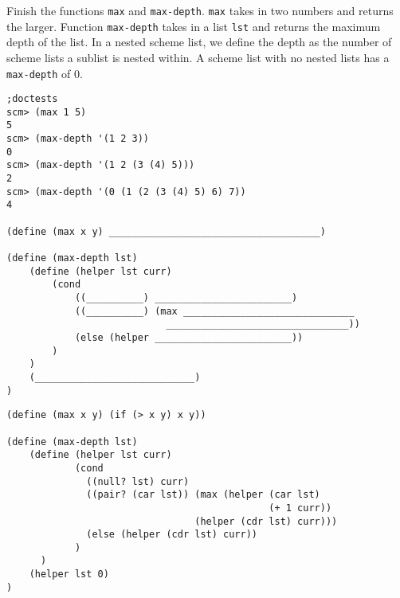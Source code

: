 \begin{blocksection}
\question Finish the functions \lstinline{max} and \lstinline{max-depth}. \lstinline{max} takes in two numbers and returns the larger. Function \lstinline{max-depth} takes in a list \lstinline{lst} and returns the maximum depth of the list. In a nested scheme list, we define the depth as the number of scheme lists a sublist is nested within. A scheme list with no nested lists has a \lstinline{max-depth} of 0. 

\begin{lstlisting}
;doctests
scm> (max 1 5)
5
scm> (max-depth '(1 2 3))
0
scm> (max-depth '(1 2 (3 (4) 5)))
2
scm> (max-depth '(0 (1 (2 (3 (4) 5) 6) 7))
4

(define (max x y) _____________________________________)

(define (max-depth lst)
    (define (helper lst curr)
        (cond 
            ((__________) ________________________)
            ((__________) (max ______________________________
                            ________________________________))
            (else (helper ________________________))
        )
    )
    (____________________________)
)
\end{lstlisting}
\end{blocksection}

\begin{blocksection}
\begin{solution}
\begin{lstlisting}
(define (max x y) (if (> x y) x y))

(define (max-depth lst)
    (define (helper lst curr)
            (cond 
              ((null? lst) curr)
              ((pair? (car lst)) (max (helper (car lst) 
                                              (+ 1 curr)) 
                                 (helper (cdr lst) curr)))
              (else (helper (cdr lst) curr))
            )
      )
    (helper lst 0)
)

\end{lstlisting}
\end{solution}
\end{blocksection}